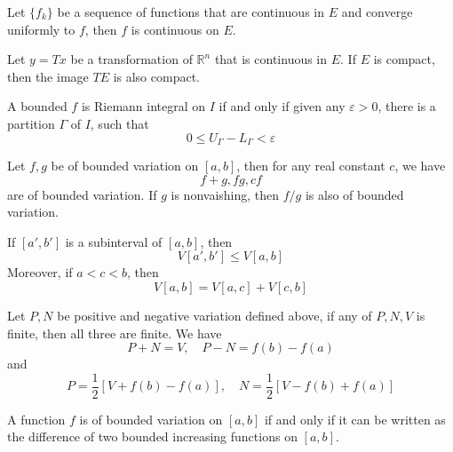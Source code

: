 \documentclass[openany]{book}
\newcommand{\R}{\mathbb{R}}
\begin{document}
\begin{thm}
    Let $\{f_k\}$ be a sequence of functions that are continuous in $E$ and converge uniformly to $f$, then $f$ is continuous on $E$. 
\end{thm}
\begin{prop}
    Let $y=Tx$ be a transformation of $\R^n$ that is continuous in $E$. If $E$ is compact, then the image $TE$ is also compact.
\end{prop}
\begin{prop}
    A bounded $f$ is Riemann integral on $I$ if and only if given any $\varepsilon>0$, there is a partition $\Gamma$ of $I$, such that 
    \begin{equation*}
        0\leq U_\Gamma-L_\Gamma<\varepsilon
    \end{equation*}
\end{prop}
\begin{prop}
    Let $f,g$ be of bounded variation on $[a,b]$, then for any real constant $c$, we have 
    \begin{equation*}
        f+g, fg, cf
    \end{equation*}
    are of bounded variation. If $g$ is nonvaishing, then $f/g$ is also of bounded variation.
\end{prop}
\begin{prop}
    If $[a',b']$ is a subinterval of $[a,b]$, then 
    \begin{equation*}
        V[a',b']\leq V[a,b]
    \end{equation*}
    Moreover, if $a<c<b$, then 
    \begin{equation*}
        V[a,b]=V[a,c]+V[c,b]
    \end{equation*}
\end{prop}
\begin{prop}
    Let $P,N$ be positive and negative variation defined above, if any of $P,N,V$ is finite, then all three are finite. We have 
    \begin{equation*}
        P+N=V, \quad P-N=f(b)-f(a)
    \end{equation*}
    and 
    \begin{equation*}
        P=\frac{1}{2}[V+f(b)-f(a)], \quad N=\frac{1}{2}[V-f(b)+f(a)]
    \end{equation*}
\end{prop}
\begin{thm}
    A function $f$ is of bounded variation on $[a,b]$ if and only if it can be written as the difference of two bounded increasing functions on $[a,b]$.
\end{thm}
\end{document}

